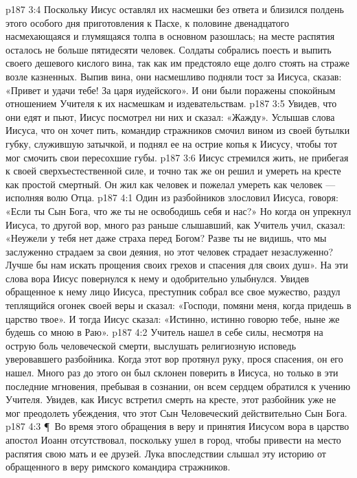 \vs p187 3:4 Поскольку Иисус оставлял их насмешки без ответа и близился полдень этого особого дня приготовления к Пасхе, к половине двенадцатого насмехающаяся и глумящаяся толпа в основном разошлась; на месте распятия осталось не больше пятидесяти человек. Солдаты собрались поесть и выпить своего дешевого кислого вина, так как им предстояло еще долго стоять на страже возле казненных. Выпив вина, они насмешливо подняли тост за Иисуса, сказав: «Привет и удачи тебе! За царя иудейского». И они были поражены спокойным отношением Учителя к их насмешкам и издевательствам.
\vs p187 3:5 Увидев, что они едят и пьют, Иисус посмотрел ни них и сказал: «Жажду». Услышав слова Иисуса, что он хочет пить, командир стражников смочил вином из своей бутылки губку, служившую затычкой, и поднял ее на острие копья к Иисусу, чтобы тот мог смочить свои пересохшие губы.
\vs p187 3:6 Иисус стремился жить, не прибегая к своей сверхъестественной силе, и точно так же он решил и умереть на кресте как простой смертный. Он жил как человек и пожелал умереть как человек --- исполняя волю Отца.
\vs p187 4:1 Один из разбойников злословил Иисуса, говоря: «Если ты Сын Бога, что же ты не освободишь себя и нас?» Но когда он упрекнул Иисуса, то другой вор, много раз раньше слышавший, как Учитель учил, сказал: «Неужели у тебя нет даже страха перед Богом? Разве ты не видишь, что мы заслуженно страдаем за свои деяния, но этот человек страдает незаслуженно? Лучше бы нам искать прощения своих грехов и спасения для своих душ». На эти слова вора Иисус повернулся к нему и одобрительно улыбнулся. Увидев обращенное к нему лицо Иисуса, преступник собрал все свое мужество, раздул теплящийся огонек своей веры и сказал: «Господи, помяни меня, когда придешь в царство твое». И тогда Иисус сказал: «Истинно, истинно говорю тебе, ныне же будешь со мною в Раю».
\vs p187 4:2 Учитель нашел в себе силы, несмотря на острую боль человеческой смерти, выслушать религиозную исповедь уверовавшего разбойника. Когда этот вор протянул руку, прося спасения, он его нашел. Много раз до этого он был склонен поверить в Иисуса, но только в эти последние мгновения, пребывая в сознании, он всем сердцем обратился к учению Учителя. Увидев, как Иисус встретил смерть на кресте, этот разбойник уже не мог преодолеть убеждения, что этот Сын Человеческий действительно Сын Бога.
\vs p187 4:3 \P\ Во время этого обращения в веру и принятия Иисусом вора в царство апостол Иоанн отсутствовал, поскольку ушел в город, чтобы привести на место распятия свою мать и ее друзей. Лука впоследствии слышал эту историю от обращенного в веру римского командира стражников.
